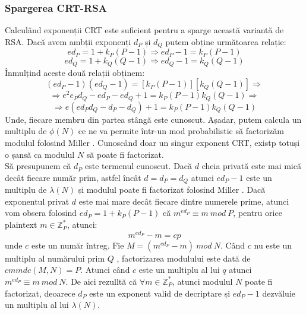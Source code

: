 \documentclass[12]{report}
\begin{document}
\subsubsection{Spargerea CRT-RSA}
Calculând exponenții CRT este suficient pentru a sparge această variantă de RSA. Dacă avem ambții exponenți $d_P$ și $d_Q$ putem obține următoarea relație:
$$ed_P = 1 + k_P(P-1) \Rightarrow ed_P -1 = k_P(P-1)$$
$$ed_Q = 1 + k_Q(Q-1) \Rightarrow ed_Q -1 =k_Q(Q-1)$$
Înmulțind aceste două relații obținem:
$$ (ed_P -1 ) (ed_Q -1) = [k_P(P-1)][k_Q(Q-1)] \Rightarrow $$
$$ \Rightarrow e^2e_Pd_Q - ed_P - ed_Q +1 = k_P(P-1)k_Q(Q-1) \Rightarrow$$
$$ \Rightarrow e(ed_Pd_Q - d_P -d_Q)+1 = k_P(P-1)k_Q(Q-1)$$
Unde, fiecare membru din partea stângă este cunoscut.  Așadar, putem calcula un multiplu de $\phi(N)$ ce ne va permite într-un mod probabilistic să factorizăm modulul folosind Miller \cite{miller}.
Cunoscând doar un singur exponent CRT, existp totuși o șansă ca modulul $N$ să poate fi factorizat.\\
Să presupunem că $d_P$ este termenul cunoscut. Dacă $d$ cheia privată este mai mică decât fiecare număr prim, astfel încât $d = d_P = d_Q$ atunci $ed_P-1$ este un multiplu de $\lambda(N)$ și modulul poate fi factorizat folosind Miller \cite{miller}. Dacă exponentul privat $d$ este mai mare decât fiecare dintre numerele prime, atunci vom obsera folosind $ed_P = 1 + k_P(P-1)$ că $m^{ed_P} \equiv m \ mod \ P$, pentru orice plaintext $m \in \mathbb{Z}_{P}^{*}$, atunci:
$$ m^{ed_P} - m = cp$$
unde $c$ este un număr întreg. Fie $M=(m^{ed_P} - m) \ mod \ N$. Când $c$ nu este un multiplu al numărului prim $Q$ , factorizarea modulului este dată de $cmmdc(M,N)=P$. Atunci când $c$ este un multiplu al lui $q$ atunci $m^{ed_P} \equiv m \ mod \ N$. De aici rezulltă că $\forall m \in \mathbb{Z}_{P}^{*}$, atunci modulul $N$ poate fi factorizat, deoarece $d_P$ este un exponent valid de decriptare și $ed_P-1$ dezvăluie un multiplu al lui $\lambda(N)$.
\end{document}
